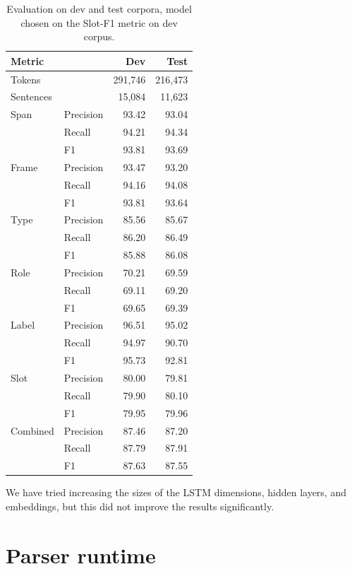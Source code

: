 \documentclass[11pt,a4paper]{article}
\begin{document}
\begin{table}[ht]
\begin{tabular}{|ll|r|r|}
\hline
{\bf Metric} & & {\bf Dev} & {\bf Test} \\
\hline
Tokens & & 291,746  & 216,473  \\
\hline
Sentences &   & 15,084 & 11,623  \\
\hline
\hline
Span & Precision & 93.42  & 93.04 \\
\hline
& Recall & 94.21 & 94.34 \\
\hline
& F1 & 93.81 & 93.69 \\
\hline
Frame & Precision & 93.47 & 93.20 \\
\hline
& Recall & 94.16 & 94.08 \\
\hline
& F1 & 93.81 & 93.64\\
\hline
Type & Precision & 85.56  & 85.67 \\
\hline
& Recall & 86.20 & 86.49 \\
\hline
& F1 & 85.88 & 86.08 \\
\hline
Role & Precision & 70.21 & 69.59 \\
\hline
& Recall & 69.11 & 69.20 \\
\hline
& F1 & 69.65 & 69.39 \\
\hline
Label & Precision & 96.51 & 95.02 \\
\hline
& Recall & 94.97 & 90.70 \\
\hline
& F1 & 95.73 & 92.81 \\
\hline
Slot & Precision & 80.00 & 79.81 \\
\hline
& Recall & 79.90 & 80.10 \\
\hline
& F1 & 79.95 & 79.96 \\
\hline
Combined & Precision & 87.46 & 87.20 \\
\hline
& Recall & 87.79 & 87.91 \\
\hline
& F1 & 87.63 & 87.55 \\
\hline
\end{tabular}
\caption{Evaluation on dev and test corpora, model
chosen on the Slot-F1 metric on dev corpus.}
\label{tab:eval}
\end{table}

We have tried increasing the sizes of the LSTM dimensions, hidden layers,
and embeddings, but this did not improve the results significantly.

\section{Parser runtime}
\label{sec:runtime}
\end{document}
